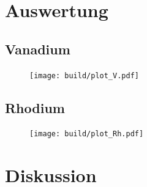 
\section{Auswertung}

\subsection{Vanadium}%

\begin{figure}
    \centering
    \texttt{[image: build/plot\_V.pdf]}
    \caption{} %
    \label{fig:a} %
\end{figure}

\subsection{Rhodium} %

\begin{figure}
    \centering
    \texttt{[image: build/plot\_Rh.pdf]}
    \caption{} %
    \label{fig:b} %
\end{figure}


\section{Diskussion}



\newpage
\printbibliography

